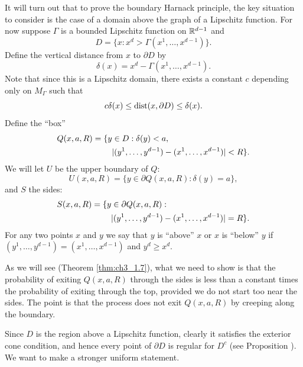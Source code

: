 
It will turn out that to prove the boundary Harnack principle, the key situation to consider is the case of a domain above the graph of a Lipschitz function. For now suppose $\Gamma$ is a bounded Lipschitz function on $\mathbb{R}^{d-1}$ and
\mpagebreak
\[
    D = \{x : x^d > \Gamma(x^1,\ldots,x^{d-1})\}.
\]
Define the vertical distance from $x$ to $\partial D$ by
\begin{equation}\label{eq:ch3_1.6}
    \delta(x) = x^d - \Gamma(x^1,\ldots,x^{d-1}).
\end{equation}
Note that since this is a Lipschitz domain, there exists a constant $c$ depending only on $M_\Gamma$ such that
\begin{equation}\label{eq:ch3_1.7}
    c\delta(x) \leq \operatorname{dist}(x,\partial D) \leq \delta(x).
\end{equation}
Define the ``box''
\begin{align}\label{eq:ch3_1.8}
    Q(x,a,R) &= \{y \in D : \delta(y) < a, \\
    &\qquad\,\,|(y^1,\ldots,y^{d-1})-(x^1,\ldots,x^{d-1})| < R\}. \notag
\end{align}
We will let $U$ be the upper boundary of $Q$:
\begin{equation}\label{eq:ch3_1.9}
    U(x,a,R) = \{y \in \partial Q(x,a,R) : \delta(y) = a\},
\end{equation}
and $S$ the sides:
\begin{align}\label{eq:ch3_1.10}
    S(x,a,R) &= \{y \in \partial Q(x,a,R) : \\
    &\qquad\,\,|(y^1,\ldots,y^{d-1})-(x^1,\ldots,x^{d-1})| = R\}. \notag
\end{align}
For any two points $x$ and $y$ we say that $y$ is ``above'' $x$ or $x$ is ``below'' $y$ if $(y^1,\ldots,y^{d-1}) = (x^1,\ldots,x^{d-1})$ and $y^d \geq x^d$.

As we will see (Theorem \ref{thm:ch3_1.7}), what we need to show is that the probability of exiting $Q(x,a,R)$ through the sides is less than a constant times the probability of exiting through the top, provided we do not start too near the sides. The point is that the process does not exit $Q(x,a,R)$ by creeping along the boundary.

Since $D$ is the region above a Lipschitz function, clearly it satisfies the exterior cone condition, and hence every point of $\partial D$ is regular for $D^c$ (see Proposition ). We want to make a stronger uniform statement.

